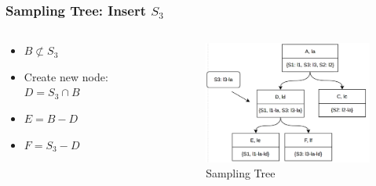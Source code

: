 \documentclass[notheorems, aspectratio=54]{beamer}
\begin{document}
\begin{frame}
    \frametitle{Sampling Tree: Insert $S_3$}
    \begin{columns}
        \begin{column}{0.48\textwidth}
            \begin{itemize}
                \item $B \not\subset S_3$
                \item Create new node: $D = S_3 \cap B$
                \item $E = B-D$
                \item $F = S_3-D$
            \end{itemize}
        \end{column}
        \begin{column}{0.48\textwidth}
            \begin{figure}
                \centering
                \includegraphics[width=6cm]{global_img_dir/insert2.png}
                \caption{Sampling Tree}
            \end{figure}
        \end{column}
    \end{columns}
\end{frame}
\end{document}

